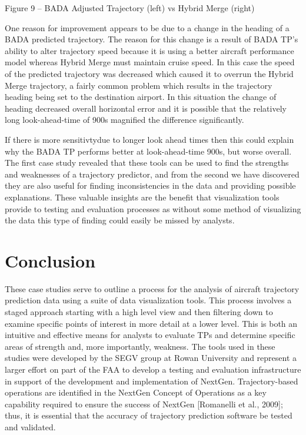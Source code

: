 \documentclass[]{article}
\begin{document}
Figure 9 – BADA Adjusted Trajectory (left) vs Hybrid Merge (right)

One reason for improvement appears to be due to a change in the heading of a BADA predicted trajectory. The reason for this change is a result of BADA TP’s ability to alter trajectory speed because it is using a better aircraft performance model whereas Hybrid Merge must maintain cruise speed. In this case the speed of the predicted trajectory was decreased which caused it to overrun the Hybrid Merge trajectory, a fairly common problem which results in the trajectory heading being set to the destination airport. In this situation the change of heading decreased overall horizontal error and it is possible that the relatively long look-ahead-time of 900s magnified the difference significantly. 

If there is more sensitivtydue to longer look ahead times then this could explain why the BADA TP performs better at look-ahead-time 900s, but worse overall. The first case study revealed that these tools can be used to find the strengths and weaknesses of a trajectory predictor, and from the second we have discovered they are also useful for finding inconsistencies in the data and providing possible explanations. These valuable insights are the benefit that visualization tools provide to testing and evaluation processes as without some method of visualizing the data this type of finding could easily be missed by analysts.
 
\section{Conclusion}
\label{conclusion}
These case studies serve to outline a process for the analysis of aircraft trajectory prediction data using a suite of data visualization tools. This process involves a staged approach starting with a high level view and then filtering down to examine specific points of interest in more detail at a lower level. This is both an intuitive and effective means for analysts to evaluate TPs and determine specific areas of strength and, more importantly, weakness. The tools used in these studies were developed by the SEGV group at Rowan University and represent a larger effort on part of the FAA to develop a testing and evaluation infrastructure in support of the development and implementation of NextGen. Trajectory-based operations are identified in the NextGen Concept of Operations as a key capability required to ensure the success of NextGen [Romanelli et al., 2009]; thus, it is essential that the accuracy of trajectory prediction software be tested and validated.
\end{document}
